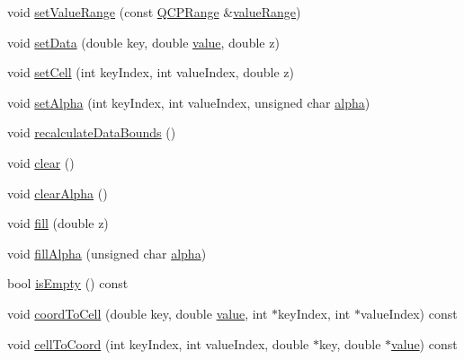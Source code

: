 \begin{DoxyCompactItemize}
\item 
void \mbox{\hyperlink{class_q_c_p_color_map_data_ada1b2680ba96a5f4175b6d341cf75d23}{set\+Value\+Range}} (const \mbox{\hyperlink{class_q_c_p_range}{Q\+C\+P\+Range}} \&\mbox{\hyperlink{class_q_c_p_color_map_data_a818e4e384aa4e5fad69ac603924394d3}{value\+Range}})
\item 
void \mbox{\hyperlink{class_q_c_p_color_map_data_afd2083ccfd6987ec94aa7ef8e91ca39a}{set\+Data}} (double key, double \mbox{\hyperlink{diffusion_8cpp_a4b41795815d9f3d03abfc739e666d5da}{value}}, double z)
\item 
void \mbox{\hyperlink{class_q_c_p_color_map_data_a8e75eaf8746596319032a93f3d2d0683}{set\+Cell}} (int key\+Index, int value\+Index, double z)
\item 
void \mbox{\hyperlink{class_q_c_p_color_map_data_aaf7de5b34c58f38d8f4c1ceb064a876c}{set\+Alpha}} (int key\+Index, int value\+Index, unsigned char \mbox{\hyperlink{class_q_c_p_color_map_data_a4f7e6b7a97017400cbbd46f0660e68ea}{alpha}})
\item 
void \mbox{\hyperlink{class_q_c_p_color_map_data_ab235ade8a4d64bd3adb26a99b3dd57ee}{recalculate\+Data\+Bounds}} ()
\item 
void \mbox{\hyperlink{class_q_c_p_color_map_data_a9910ba830e96955bd5c8e5bef1e77ef3}{clear}} ()
\item 
void \mbox{\hyperlink{class_q_c_p_color_map_data_a14d08b9c3720cd719400079b86d3906b}{clear\+Alpha}} ()
\item 
void \mbox{\hyperlink{class_q_c_p_color_map_data_a350f783260eb9b5de5c7b5e0d5d3e3c2}{fill}} (double z)
\item 
void \mbox{\hyperlink{class_q_c_p_color_map_data_a93e2a549d7702bc849cd48a585294657}{fill\+Alpha}} (unsigned char \mbox{\hyperlink{class_q_c_p_color_map_data_a4f7e6b7a97017400cbbd46f0660e68ea}{alpha}})
\item 
bool \mbox{\hyperlink{class_q_c_p_color_map_data_aea88cc75a76ca571acf29b2ba8ac970d}{is\+Empty}} () const
\item 
void \mbox{\hyperlink{class_q_c_p_color_map_data_aca5b29e0ca2f299c9060fc6e1f74d0c8}{coord\+To\+Cell}} (double key, double \mbox{\hyperlink{diffusion_8cpp_a4b41795815d9f3d03abfc739e666d5da}{value}}, int $\ast$key\+Index, int $\ast$value\+Index) const
\item 
void \mbox{\hyperlink{class_q_c_p_color_map_data_af1a36385c78ab624cd617065602408b6}{cell\+To\+Coord}} (int key\+Index, int value\+Index, double $\ast$key, double $\ast$\mbox{\hyperlink{diffusion_8cpp_a4b41795815d9f3d03abfc739e666d5da}{value}}) const
\end{DoxyCompactItemize}
